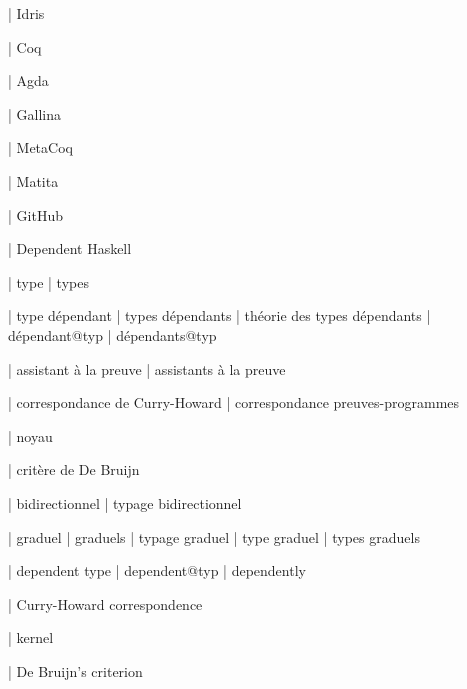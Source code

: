 





  | Idris

  | Coq

  | Agda

  | Gallina

  | MetaCoq

  | Matita

  | GitHub

  | Dependent Haskell


  | type
  | types

  | type dépendant
  | types dépendants
  | théorie des types dépendants
  | dépendant@typ
  | dépendants@typ

  | assistant à la preuve
  | assistants à la preuve

  | correspondance de Curry-Howard
  | correspondance preuves-programmes

  | noyau

  | critère de De Bruijn

  | bidirectionnel
  | typage bidirectionnel

  | graduel
  | graduels
  | typage graduel
  | type graduel
  | types graduels


  | dependent type
  | dependent@typ
  | dependently

  | Curry-Howard correspondence

  | kernel

  | De Bruijn’s criterion

